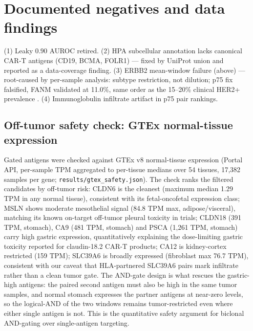 \documentclass[11pt]{article}
\begin{document}


\section{Documented negatives and data findings}
(1) Leaky $0.90$ AUROC retired. (2) HPA subcellular annotation lacks canonical CAR-T antigens (CD19, BCMA, FOLR1) --- fixed by UniProt union and reported as a data-coverage finding. (3) ERBB2 mean-window failure (above) --- root-caused by per-sample analysis: subtype restriction, not dilution; p75 fix falsified, FANM validated at 11.0\%, same order as the 15--20\% clinical HER2+ prevalence \cite{her2}. (4) Immunoglobulin infiltrate artifact in p75 pair rankings.
\subsection{Off-tumor safety check: GTEx normal-tissue expression}
Gated antigens were checked against GTEx v8 normal-tissue expression
(Portal API, per-sample TPM aggregated to per-tissue medians over 54
tissues, 17{,}382 samples per gene; \texttt{results/gtex\_safety.json}).
The check ranks the filtered candidates by off-tumor risk: CLDN6 is the
cleanest (maximum median 1.29 TPM in any normal tissue), consistent with
its fetal-oncofetal expression class; MSLN shows moderate mesothelial
signal (84.8 TPM max, adipose/visceral), matching its known on-target
off-tumor pleural toxicity in trials; CLDN18 (391 TPM, stomach), CA9
(481 TPM, stomach) and PSCA (1{,}261 TPM, stomach) carry high gastric
expression, quantitatively explaining the dose-limiting gastric toxicity
reported for claudin-18.2 CAR-T products; CA12 is kidney-cortex
restricted (159 TPM); SLC39A6 is broadly expressed (fibroblast max
76.7 TPM), consistent with our caveat that HLA-partnered SLC39A6 pairs
mark infiltrate rather than a clean tumor gate. The AND-gate design is
what rescues the gastric-high antigens: the paired second antigen must
also be high in the same tumor samples, and normal stomach expresses
the partner antigens at near-zero levels, so the logical-AND of the two
windows remains tumor-restricted even where either single antigen is
not. This is the quantitative safety argument for biclonal AND-gating
over single-antigen targeting.
\end{document}
